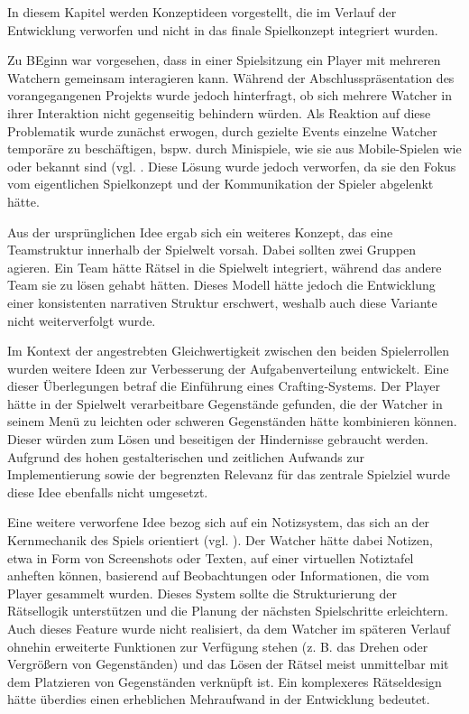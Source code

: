 In diesem Kapitel werden Konzeptideen vorgestellt, die im Verlauf der Entwicklung verworfen und nicht in das finale Spielkonzept integriert wurden.

Zu BEginn war vorgesehen, dass in einer Spielsitzung ein Player mit mehreren Watchern gemeinsam interagieren kann. Während der Abschlusspräsentation des vorangegangenen Projekts wurde jedoch hinterfragt, ob sich mehrere Watcher in ihrer Interaktion nicht gegenseitig behindern würden. Als Reaktion auf diese Problematik wurde zunächst erwogen, durch gezielte Events einzelne Watcher temporäre zu beschäftigen, bspw. durch Minispiele, wie sie aus Mobile-Spielen wie  oder  bekannt sind (vgl. \citealp{everbyte_duskwood_2019,jaunt_sentence_2019}. Diese Lösung wurde jedoch verworfen, da sie den Fokus vom eigentlichen Spielkonzept und der Kommunikation der Spieler abgelenkt hätte.

Aus der ursprünglichen Idee ergab sich ein weiteres Konzept, das eine Teamstruktur innerhalb der Spielwelt vorsah. Dabei sollten zwei Gruppen agieren. Ein Team hätte Rätsel in die Spielwelt integriert, während das andere Team sie zu lösen gehabt hätten. Dieses Modell hätte jedoch die Entwicklung einer konsistenten narrativen Struktur erschwert, weshalb auch diese Variante nicht weiterverfolgt wurde.

Im Kontext der angestrebten Gleichwertigkeit zwischen den beiden Spielerrollen wurden weitere Ideen zur Verbesserung der Aufgabenverteilung entwickelt. Eine dieser Überlegungen betraf die Einführung eines Crafting-Systems. Der Player hätte in der Spielwelt verarbeitbare Gegenstände gefunden, die der Watcher in seinem Menü zu leichten oder schweren Gegenständen hätte kombinieren können. Dieser würden zum Lösen und beseitigen der Hindernisse gebraucht werden. Aufgrund des hohen gestalterischen und zeitlichen Aufwands zur Implementierung sowie der begrenzten Relevanz für das zentrale Spielziel wurde diese Idee ebenfalls nicht umgesetzt.

Eine weitere verworfene Idee bezog sich auf ein Notizsystem, das sich an der Kernmechanik des Spiels  orientiert (vgl. \citealp{colepowered_games_shadows_2023}). Der Watcher hätte dabei Notizen, etwa in Form von Screenshots oder Texten, auf einer virtuellen Notiztafel anheften können, basierend auf Beobachtungen oder Informationen, die vom Player gesammelt wurden. Dieses System sollte die Strukturierung der Rätsellogik unterstützen und die Planung der nächsten Spielschritte erleichtern. Auch dieses Feature wurde nicht realisiert, da dem Watcher im späteren Verlauf ohnehin erweiterte Funktionen zur Verfügung stehen (z. B. das Drehen oder Vergrößern von Gegenständen) und das Lösen der Rätsel meist unmittelbar mit dem Platzieren von Gegenständen verknüpft ist. Ein komplexeres Rätseldesign hätte überdies einen erheblichen Mehraufwand in der Entwicklung bedeutet. 